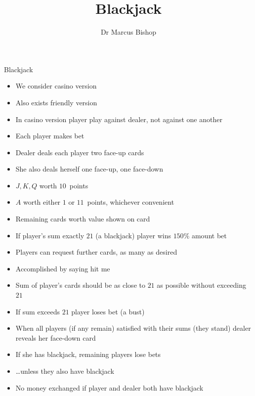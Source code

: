 \documentclass[handout]{beamer}
\title[Blackjack]{Blackjack}
\author{Dr Marcus Bishop}
\theoremstyle{definition}
\begin{document}
\begin{frame}\titlepage\end{frame}
\LogoOff

\begin{frame}{Blackjack}
\begin{itemize}
\item We consider casino version
\item Also exists friendly version
\item In casino version player play against dealer, not against one another
\item Each player makes bet
\item Dealer deals each player two face-up cards
\item She also deals herself one face-up, one face-down
\item $J,K,Q$ worth $10$~points
\item $A$ worth either $1$ or $11$~points, whichever convenient
\item Remaining cards worth value shown on card
\end{itemize}
\end{frame}

\begin{frame}
\begin{itemize}
\item If player's sum exactly $21$ (a \alert{blackjack}) player wins
$150\%$ amount bet
\item Players can request further cards, as many as desired
\item Accomplished by saying \alert{hit me}
\item Sum of player's cards should be as close to $21$ as possible
without exceeding $21$
\item If sum exceeds $21$ player loses bet (a \alert{bust})
\item When all players (if any remain)
satisfied with their sums
(they \alert{stand}) dealer reveals her
face-down card
\item If she has blackjack, remaining players lose bets
\item \dots unless they also have blackjack
\item No money exchanged if player and dealer both have blackjack
\end{itemize}
\end{frame}
\end{document}
